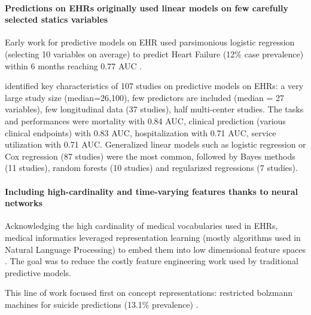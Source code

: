 \documentclass[french,12pt,twoside,a4paper]{book}
\begin{document}
\begin{appendices}
  \paragraph{Predictions on EHRs originally used linear models on few carefully selected statics variables}
  Early work for predictive models on EHR used \textcolor{M}{parsimonious logistic regression}
  (selecting 10 variables on average) to predict \textcolor{O}{Heart Failure} (12\% case
  prevalence) within 6 months reaching \textcolor{S}{0.77 AUC} \citep{wu2010prediction}.

  \cite{goldstein2017opportunities} identified key characteristics of 107 studies
  on predictive models on EHRs: a very large study size (median=26,100), few
  predictors are included (median = 27 variables), few longitudinal data (37
  studies), half multi-center studies. The tasks and performances were
  \textcolor{O}{mortality} with \textcolor{S}{0.84 AUC}, \textcolor{O}{clinical
    prediction (various clinical endpoints)} with \textcolor{S}{0.83 AUC},
  \textcolor{O}{hospitalization} with \textcolor{S}{0.71 AUC},
  \textcolor{O}{service utilization} with \textcolor{S}{0.71 AUC}.
  \textcolor{M}{Generalized linear models such as logistic regression or Cox
    regression} (87 studies) were the most common, followed by \textcolor{M}{Bayes
    methods} (11 studies), \textcolor{M}{random forests} (10 studies) and
  \textcolor{M}{regularized regressions} (7 studies).

  \paragraph{Including high-cardinality and time-varying features thanks to neural networks}

  Acknowledging the high cardinality of medical vocabularies used in EHRs, medical
  informatics leveraged representation learning (mostly algorithms used in Natural
  Language Processing) to embed them into low dimensional feature spaces
  \citep{shickel2017deep}. The goal was to reduce the costly feature engineering
  work used by traditional predictive models.

  This line of work focused first on concept representations:
  \textcolor{M}{restricted bolzmann machines} for \textcolor{O}{suicide
    predictions} (13.1\% prevalence) \citep{tran2015learning}.


\end{appendices}
\end{document}
